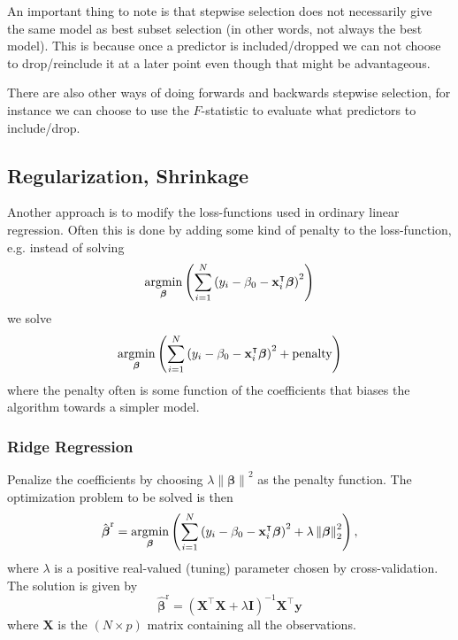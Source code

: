 \documentclass[a4paper, 12pt]{scrartcl}
\newcommand{\bfbeta}{\boldsymbol{\beta}}
\newcommand{\bfx}{\mathbf{x}}
\begin{document}
An important thing to note is that stepwise selection does not necessarily give the same model as best subset selection (in other words, not always the best model).
This is because once a predictor is included/dropped we can not choose to drop/reinclude it at a later point even though that might be advantageous.

There are also other ways of doing forwards and backwards stepwise selection, for instance we can choose to use the $F$-statistic to evaluate what predictors to include/drop.

\subsection{Regularization, Shrinkage}
Another approach is to modify the loss-functions used in ordinary linear regression.
Often this is done by adding some kind of penalty to the loss-function, e.g. instead of solving
\begin{equation*}
	\operatornamewithlimits{argmin}_{\bfbeta}\left( \sum_{i=1}^{N}\left(y_i-\beta_0-\bfx_i^\intercal\bfbeta \right)^2\right)
\end{equation*}
we solve
\begin{equation*}
	\operatornamewithlimits{argmin}_{\bfbeta}\left( \sum_{i=1}^{N}\left(y_i-\beta_0-\bfx_i^\intercal\bfbeta\right)^2+\text{penalty}\right)
\end{equation*}
where the penalty often is some function of the coefficients that biases the algorithm towards a simpler model.

\subsubsection*{Ridge Regression}
\begin{algorithm}
Penalize the coefficients by choosing $\lambda\left\|\bfbeta\right\|^2$ as the penalty function.
The optimization problem to be solved is then
\begin{equation*} \hat{\bfbeta}^\mathrm{r}=\operatornamewithlimits{argmin}_{\bfbeta}\left( \sum_{i=1}^{N}\left(y_i-\beta_0-\bfx_i^\intercal\bfbeta\right)^2+\lambda\left\|\bfbeta\right\|^2_2\right),
\end{equation*}
where $\lambda$ is a positive real-valued (tuning) parameter chosen by cross-validation.
The solution is given by
\begin{equation*}
	\hat{\bfbeta}^\mathrm{r}=\left(\mathbf{X}^\intercal\mathbf{X}+\lambda\mathbf{I}\right)^{-1}\mathbf{X}^\intercal\mathbf{y}
\end{equation*}
where $\mathbf{X}$ is the $\left(N\times p\right)$ matrix containing all the observations.
\end{algorithm}
\end{document}
